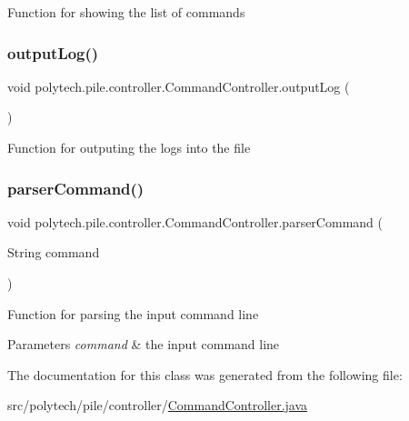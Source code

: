 Function for showing the list of commands \hypertarget{classpolytech_1_1pile_1_1controller_1_1_command_controller_a8b23ab89dde1b77aa64848af6d1f6880}{}\label{classpolytech_1_1pile_1_1controller_1_1_command_controller_a8b23ab89dde1b77aa64848af6d1f6880} 
\subsubsection{\texorpdfstring{output\+Log()}{outputLog()}}
{\footnotesize\ttfamily void polytech.\+pile.\+controller.\+Command\+Controller.\+output\+Log (\begin{DoxyParamCaption}{ }\end{DoxyParamCaption})}

Function for outputing the logs into the file \hypertarget{classpolytech_1_1pile_1_1controller_1_1_command_controller_a526c1cca589e31c4be31059e0a48fe09}{}\label{classpolytech_1_1pile_1_1controller_1_1_command_controller_a526c1cca589e31c4be31059e0a48fe09} 
\subsubsection{\texorpdfstring{parser\+Command()}{parserCommand()}}
{\footnotesize\ttfamily void polytech.\+pile.\+controller.\+Command\+Controller.\+parser\+Command (\begin{DoxyParamCaption}\item[{String}]{command }\end{DoxyParamCaption})}

Function for parsing the input command line


\begin{DoxyParams}{Parameters}
{\em command} & the input command line \\
\hline
\end{DoxyParams}


The documentation for this class was generated from the following file\+:\begin{DoxyCompactItemize}
\item 
src/polytech/pile/controller/\hyperlink{_command_controller_8java}{Command\+Controller.\+java}\end{DoxyCompactItemize}
